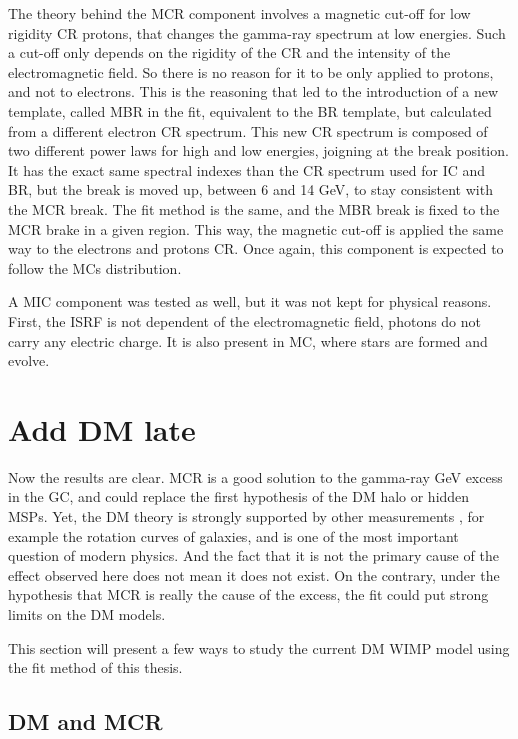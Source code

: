 The theory behind the MCR component involves a magnetic cut-off for low rigidity CR protons, that changes the gamma-ray spectrum at low energies. Such a cut-off only depends on the rigidity of the CR and the intensity of the electromagnetic field. So there is no reason for it to be only applied to protons, and not to electrons. This is the reasoning that led to the introduction of a new template, called MBR in the fit, equivalent to the BR template, but calculated from a different electron CR spectrum.
This new CR spectrum is composed of two different power laws for high and low energies, joigning at the break position. It has the exact same spectral indexes than the CR spectrum used for IC and BR, but the break is moved up, between 6 and 14 GeV, to stay consistent with the MCR break. The fit method is the same, and the MBR break is fixed to the MCR brake in a given region. This way, the magnetic cut-off is applied the same way to the electrons and protons CR. Once again, this component is expected to follow the MCs distribution.

A MIC component was tested as well, but it was not kept for physical reasons. First, the ISRF is not dependent of the electromagnetic field, photons do not carry any electric charge. It is also present in MC, where stars are formed and evolve.


\newpage
\section{Add DM late}


Now the results are clear. MCR is a good solution to the gamma-ray GeV excess in the GC, and could replace the first hypothesis of the DM halo or hidden MSPs. Yet, the DM theory is strongly supported by other measurements , for example the rotation curves of galaxies, and is one of the most important question of modern physics. And the fact that it is not the primary cause of the effect observed here does not mean it does not exist. On the contrary, under the hypothesis that MCR is really the cause of the excess, the fit could put strong limits on the DM models.

This section will present a few ways to study the current DM WIMP model using the fit method of this thesis.

\subsection{DM and MCR}


